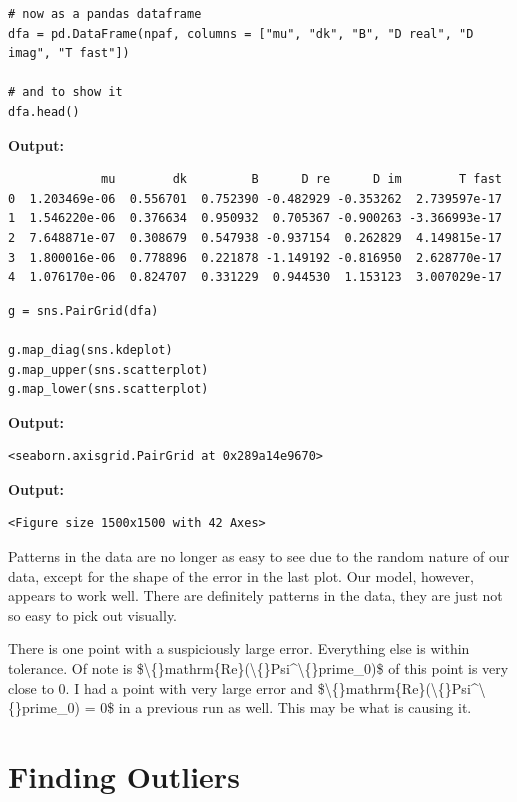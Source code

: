 \documentclass{article}
\begin{document}
\begin{lstlisting}
# now as a pandas dataframe
dfa = pd.DataFrame(npaf, columns = ["mu", "dk", "B", "D real", "D imag", "T fast"])

# and to show it
dfa.head()\end{lstlisting}

\textbf{Output:}\begin{verbatim}
             mu        dk         B      D re      D im        T fast
0  1.203469e-06  0.556701  0.752390 -0.482929 -0.353262  2.739597e-17
1  1.546220e-06  0.376634  0.950932  0.705367 -0.900263 -3.366993e-17
2  7.648871e-07  0.308679  0.547938 -0.937154  0.262829  4.149815e-17
3  1.800016e-06  0.778896  0.221878 -1.149192 -0.816950  2.628770e-17
4  1.076170e-06  0.824707  0.331229  0.944530  1.153123  3.007029e-17
\end{verbatim}

\begin{lstlisting}
g = sns.PairGrid(dfa)

g.map_diag(sns.kdeplot)
g.map_upper(sns.scatterplot)
g.map_lower(sns.scatterplot)\end{lstlisting}

\textbf{Output:}\begin{verbatim}
<seaborn.axisgrid.PairGrid at 0x289a14e9670>
\end{verbatim}

\textbf{Output:}\begin{verbatim}
<Figure size 1500x1500 with 42 Axes>
\end{verbatim}

Patterns in the data are no longer as easy to see due to the random nature of our data, except for the shape of the error in the last plot. Our model, however, appears to work well. There are definitely patterns in the data, they are just not so easy to pick out visually.

There is one point with a suspiciously large error. Everything else is within tolerance. Of note is \$\textbackslash\{\}mathrm\{Re\}(\textbackslash\{\}Psi\textasciicircum{}\textbackslash\{\}prime\_0)\$ of this point is very close to 0. I had a point with very large error and \$\textbackslash\{\}mathrm\{Re\}(\textbackslash\{\}Psi\textasciicircum{}\textbackslash\{\}prime\_0) = 0\$ in a previous run as well. This may be what is causing it.

\section{Finding Outliers}
\end{document}
